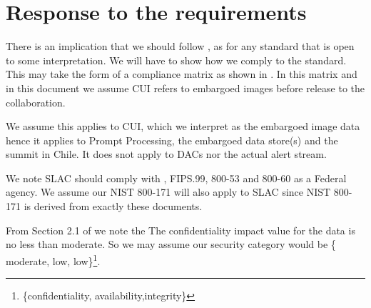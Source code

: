 \section{Response to the requirements}\label{sec:resp}

There is an implication that we should follow , as for any standard that is open to some interpretation.
We will have to show how we comply to the standard.
This may take the form of a compliance matrix as shown in .
In this matrix and in this document we assume CUI refers to embargoed images before release to the collaboration.

We assume this applies to CUI, which we interpret as the embargoed image data hence it applies to Prompt Processing, the embargoed data store(s) and the summit in Chile. It does snot apply to DACs nor the actual alert stream.

We note SLAC should comply with , FIPS.99, 800-53 and 800-60 as a Federal agency.
We assume our NIST 800-171  will also apply to SLAC since NIST 800-171 is derived from exactly these documents.

From Section 2.1 of  we note the The confidentiality impact value for the data  is no less than moderate.
So we may assume our  security category would be \{ moderate, low, low\}\footnote{\{confidentiality, availability,integrity\}}.









